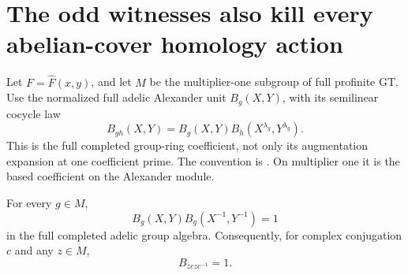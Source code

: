 \section{The odd witnesses also kill every abelian-cover homology action}

Let \(F=\widehat F(x,y)\), and let \(M\) be the multiplier-one
subgroup of full profinite GT.  Use the normalized full adelic
Alexander unit \(B_g(X,Y)\), with its semilinear cocycle law
\[
 B_{gh}(X,Y)=B_g(X,Y)B_h(X^{\lambda_g},Y^{\lambda_g}).
\]
This is the full completed group-ring coefficient, not only its
augmentation expansion at one coefficient prime.  The convention
is \cite[\S2.3, p.~101]{Furusho2003}.  On multiplier one it is
the based coefficient on the Alexander module.

\begin{lemma}\label{lem:full-integral-alexander-unitarity}
For every \(g\in M\),
\begin{equation}\label{eq:full-alexander-unitarity}
                    B_g(X,Y)B_g(X^{-1},Y^{-1})=1
\end{equation}
in the full completed adelic group algebra.  Consequently,
for complex conjugation \(c\) and any \(z\in M\),
\begin{equation}\label{eq:full-alexander-symmetrization}
                           B_{z c z c^{-1}}=1.
\end{equation}
\end{lemma}

